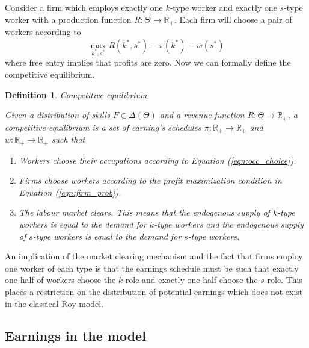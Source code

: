 \documentclass[12 pt]{article}
\newtheorem{definition}{Definition} %
\begin{document}
Consider a firm which employs exactly one $k$-type worker and exactly one $s$-type worker with a production function $R:\Theta \to \mathbb{R}_+$. Each firm will choose a pair of workers according to
\begin{equation}
	\max_{k^*,s^*} R(k^*,s^*) - \pi(k^*) - w(s^*)
	\label{eqn:firm_prob}
\end{equation}
where free entry implies that profits are zero. Now we can formally define the competitive equilibrium.

\begin{definition}{Competitive equilibrium}
	
	
 Given a distribution of skills $F\in \Delta(\Theta)$ and a revenue function $R: \Theta \to \mathbb{R}_+$, a competitive equilibrium is a set of earning's schedules $\pi : \mathbb{R}_+ \to \mathbb{R}_+$ and $w:\mathbb{R}_+ \to \mathbb{R}_+$ such that
 \begin{enumerate}
 	\item Workers choose their occupations according to Equation (\ref{eqn:occ_choice}).
 	\item Firms choose workers according to the profit maximization condition in Equation (\ref{eqn:firm_prob}).
 	\item The labour market clears. This means that the endogenous supply of $k$-type workers is equal to the demand for $k$-type workers and the endogenous supply of $s$-type workers is equal to the demand for $s$-type workers.
 \end{enumerate}
\end{definition}
An implication of the market clearing mechanism and the fact that firms employ one worker of each type is that the earnings schedule must be such that exactly one half of workers choose the $k$ role and exactly one half choose the $s$ role. This places a restriction on the distribution of potential earnings which does not exist in the classical Roy model. 

\subsection{Earnings in the model}
\end{document}
